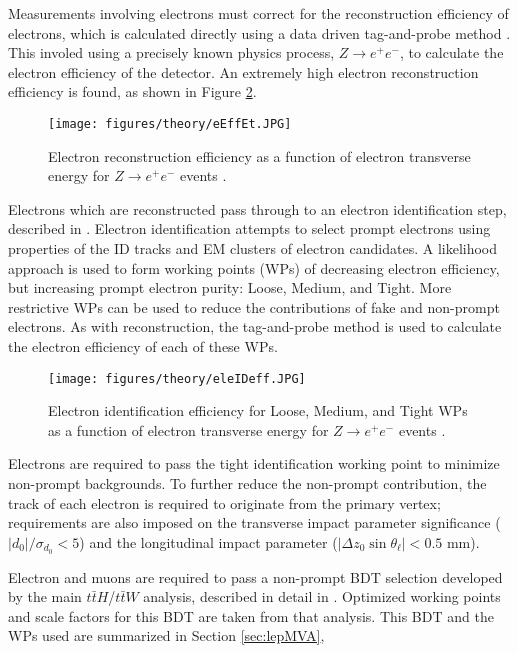Measurements involving electrons must correct for the reconstruction efficiency of electrons, which is calculated directly using a data driven tag-and-probe method \cite{tagAndProbe}. This involed using a precisely known physics process, $Z\rightarrow e^+e^-$, to calculate the electron efficiency of the detector. An extremely high electron reconstruction efficiency is found, as shown in Figure \ref{fig:eEffEt}.

\begin{figure}[H]
\centering
   \texttt{[image: figures/theory/eEffEt.JPG]}
\caption{Electron reconstruction efficiency as a function of electron transverse energy for $Z\rightarrow e^+e^-$ events \cite{tagAndProbe}.}
\label{fig:eEffEt}
\end{figure}

Electrons which are reconstructed pass through to an electron identification step, described in \cite{tagAndProbe}. Electron identification attempts to select prompt electrons using properties of the ID tracks and EM clusters of electron candidates.  A likelihood approach is used to form working points (WPs) of decreasing electron efficiency, but increasing prompt electron purity: Loose, Medium, and Tight. More restrictive WPs can be used to reduce the contributions of fake and non-prompt electrons. As with reconstruction, the tag-and-probe method is used to calculate the electron efficiency of each of these WPs. 

\begin{figure}[H]
\centering
   \texttt{[image: figures/theory/eleIDeff.JPG]}
\caption{Electron identification efficiency for Loose, Medium, and Tight WPs as a function of electron transverse energy for $Z\rightarrow e^+e^-$ events \cite{tagAndProbe}.}
\label{fig:eEffEt}
\end{figure}

Electrons are required to pass the tight identification working point to minimize non-prompt backgrounds. To further reduce the non-prompt contribution, the track of each electron is required to originate from the primary vertex; requirements are also imposed on the transverse impact parameter significance ($|d_0|/\sigma_{d_0}<5$) and the longitudinal impact parameter ($|\Delta z_0 \sin \theta_\ell|<0.5$ mm).

Electron and muons are required to pass a non-prompt BDT selection developed by the main $t\bar{t}H$/$t\bar{t}W$ analysis, described in detail in \cite{ttH_paper}. Optimized working points and scale factors for this BDT are taken from that analysis. This BDT and the WPs used are summarized in Section \ref{sec:lepMVA},

